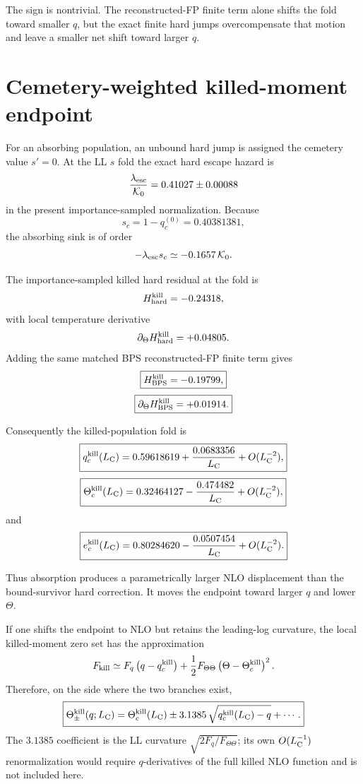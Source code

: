 \documentclass[11pt]{article}
\theoremstyle{remark}
\newcommand{\1}{\mathbf 1}
\begin{document}
The sign is nontrivial.  The reconstructed-FP finite term alone shifts the
fold toward smaller $q$, but the exact finite hard jumps overcompensate that
motion and leave a smaller net shift toward larger $q$.

\section{Cemetery-weighted killed-moment endpoint}

For an absorbing population, an unbound hard jump is assigned the cemetery
value $s'=0$.  At the LL $s$ fold the exact hard escape hazard is
\[
\frac{\lambda_{\rm esc}}{\mathcal K_0}
=
0.41027\pm0.00088
\]
in the present importance-sampled normalization.  Because
\[
s_c=1-q_c^{(0)}=0.40381381,
\]
the absorbing sink is of order
\[
-\lambda_{\rm esc}s_c\simeq-0.1657\,\mathcal K_0.
\]

The importance-sampled killed hard residual at the fold is
\[
H_{\rm hard}^{\rm kill}
=
-0.24318,
\]
with local temperature derivative
\[
\partial_\Theta H_{\rm hard}^{\rm kill}
=
+0.04805.
\]
Adding the same matched BPS reconstructed-FP finite term gives
\[
\boxed{
H_{\rm BPS}^{\rm kill}
=
-0.19799,
}
\]
\[
\boxed{
\partial_\Theta H_{\rm BPS}^{\rm kill}
=
+0.01914.
}
\]

Consequently the killed-population fold is
\[
\boxed{
q_c^{\rm kill}(L_{\rm C})
=
0.59618619
+
\frac{0.0683356}{L_{\rm C}}
+
O(L_{\rm C}^{-2}),
}
\]
\[
\boxed{
\Theta_c^{\rm kill}(L_{\rm C})
=
0.32464127
-
\frac{0.474482}{L_{\rm C}}
+
O(L_{\rm C}^{-2}),
}
\]
and
\[
\boxed{
e_c^{\rm kill}(L_{\rm C})
=
0.80284620
-
\frac{0.0507454}{L_{\rm C}}
+
O(L_{\rm C}^{-2}).
}
\]

Thus absorption produces a parametrically larger NLO displacement than the
bound-survivor hard correction.  It moves the endpoint toward larger $q$ and
lower $\Theta$.

If one shifts the endpoint to NLO but retains the leading-log curvature,
the local killed-moment zero set has the approximation
\[
F_{\rm kill}
\simeq
F_q\left(q-q_c^{\rm kill}\right)
+
\frac12F_{\Theta\Theta}
\left(\Theta-\Theta_c^{\rm kill}\right)^2.
\]
Therefore, on the side where the two branches exist,
\[
\boxed{
\Theta_\pm^{\rm kill}(q;L_{\rm C})
=
\Theta_c^{\rm kill}(L_{\rm C})
\pm
3.1385\,
\sqrt{q_c^{\rm kill}(L_{\rm C})-q}
+\cdots.
}
\]
The $3.1385$ coefficient is the LL curvature
$\sqrt{2F_q/F_{\Theta\Theta}}$; its own $O(L_{\rm C}^{-1})$ renormalization
would require $q$-derivatives of the full killed NLO function and is not
included here.
\end{document}
